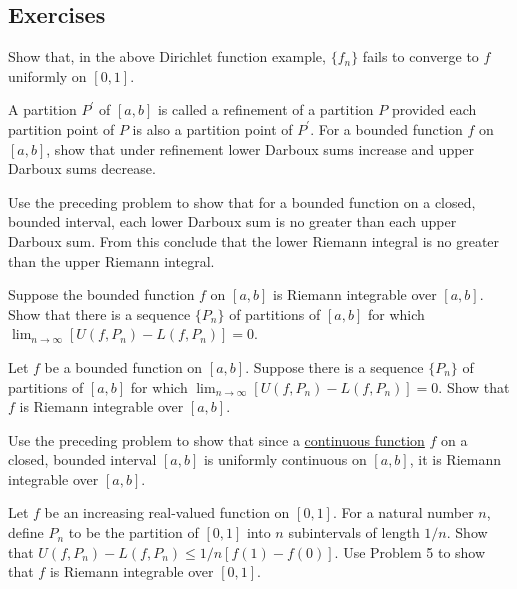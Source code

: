 \subsection{Exercises} 

  \begin{exercise}[Royden 4.1]
    Show that, in the above Dirichlet function example, $\{f_n\}$ fails to converge to $f$ uniformly on $[0, 1]$.
  \end{exercise}

  \begin{exercise}[Royden 4.2]
    A partition $P^{\prime}$ of $[a, b]$ is called a refinement of a partition $P$ provided each partition point of $P$ is also a partition point of $P^{\prime}$. For a bounded function $f$ on $[a, b]$, show that under refinement lower Darboux sums increase and upper Darboux sums decrease.
  \end{exercise}

  \begin{exercise}[Royden 4.3]
    Use the preceding problem to show that for a bounded function on a closed, bounded interval, each lower Darboux sum is no greater than each upper Darboux sum. From this conclude that the lower Riemann integral is no greater than the upper Riemann integral.
  \end{exercise}

  \begin{exercise}[Royden 4.4]
    Suppose the bounded function $f$ on $[a, b]$ is Riemann integrable over $[a, b]$. Show that there is a sequence $\{P_n\}$ of partitions of $[a, b]$ for which $\lim_{n \to \infty} [U(f, P_n) - L(f, P_n)] = 0$.
  \end{exercise}

  \begin{exercise}[Royden 4.5]
    Let $f$ be a bounded function on $[a, b]$. Suppose there is a sequence $\{P_n\}$ of partitions of $[a, b]$ for which $\lim_{n \to \infty} [U(f, P_n) - L(f, P_n)] = 0$. Show that $f$ is Riemann integrable over $[a, b]$.
  \end{exercise}

  \begin{exercise}[Royden 4.6]
    Use the preceding problem to show that since a \hyperref[pst-def:continuous_func]{continuous function} $f$ on a closed, bounded interval $[a, b]$ is uniformly continuous on $[a, b]$, it is Riemann integrable over $[a, b]$.
  \end{exercise}

  \begin{exercise}[Royden 4.7]
    Let $f$ be an increasing real-valued function on $[0, 1]$. For a natural number $n$, define $P_n$ to be the partition of $[0, 1]$ into $n$ subintervals of length $1/n$. Show that $U(f, P_n) - L(f, P_n) \leq 1/n[f(1) - f(0)]$. Use Problem 5 to show that $f$ is Riemann integrable over $[0, 1]$.
  \end{exercise}

